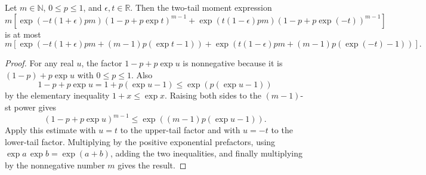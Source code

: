 \begin{helper}[BernoulliMgfTailEnvelope]
Let \(m\in\mathbb N\), \(0\le p\le1\), and \(\epsilon,t\in\mathbb R\).  Then
the two-tail moment expression
\[
m\left[
\exp(-t(1+\epsilon)pm)(1-p+p\exp t)^{m-1}
+
\exp(t(1-\epsilon)pm)(1-p+p\exp(-t))^{m-1}
\right]
\]
is at most
\[
m\left[
\exp\!\left(-t(1+\epsilon)pm+(m-1)p(\exp t-1)\right)
+
\exp\!\left(t(1-\epsilon)pm+(m-1)p(\exp(-t)-1)\right)
\right].
\]
\end{helper}
\begin{proof}
For any real \(u\), the factor \(1-p+p\exp u\) is nonnegative because it is
\((1-p)+p\exp u\) with \(0\le p\le1\).  Also
\[
1-p+p\exp u = 1+p(\exp u-1)\le \exp(p(\exp u-1))
\]
by the elementary inequality \(1+x\le\exp x\).  Raising both sides to the
\((m-1)\)-st power gives
\[
(1-p+p\exp u)^{m-1}
\le
\exp\!\left((m-1)p(\exp u-1)\right).
\]
Apply this estimate with \(u=t\) to the upper-tail factor and with \(u=-t\)
to the lower-tail factor.  Multiplying by the positive exponential prefactors,
using \(\exp a\,\exp b=\exp(a+b)\), adding the two inequalities, and finally
multiplying by the nonnegative number \(m\) gives the result.
\end{proof}
